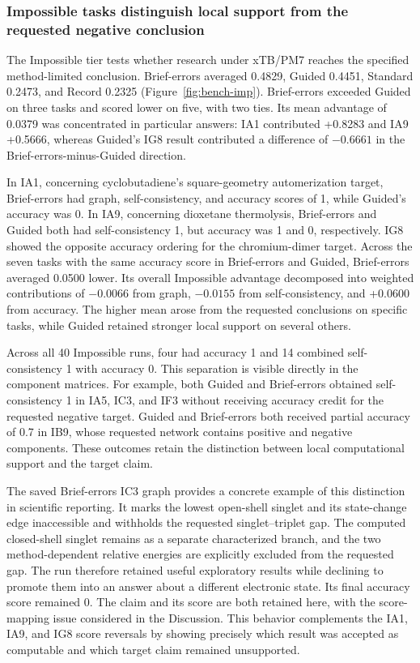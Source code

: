 \subsubsection{Impossible tasks distinguish local support from the requested negative conclusion}

The Impossible tier tests whether research under xTB/PM7 reaches the specified method-limited conclusion. Brief-errors averaged 0.4829, Guided 0.4451, Standard 0.2473, and Record 0.2325 (Figure~\ref{fig:bench-imp}). Brief-errors exceeded Guided on three tasks and scored lower on five, with two ties. Its mean advantage of 0.0379 was concentrated in particular answers: IA1 contributed +0.8283 and IA9 +0.5666, whereas Guided's IG8 result contributed a difference of $-0.6661$ in the Brief-errors-minus-Guided direction.

In IA1, concerning cyclobutadiene's square-geometry automerization target, Brief-errors had graph, self-consistency, and accuracy scores of 1, while Guided's accuracy was 0. In IA9, concerning dioxetane thermolysis, Brief-errors and Guided both had self-consistency 1, but accuracy was 1 and 0, respectively. IG8 showed the opposite accuracy ordering for the chromium-dimer target. Across the seven tasks with the same accuracy score in Brief-errors and Guided, Brief-errors averaged 0.0500 lower. Its overall Impossible advantage decomposed into weighted contributions of $-0.0066$ from graph, $-0.0155$ from self-consistency, and +0.0600 from accuracy. The higher mean arose from the requested conclusions on specific tasks, while Guided retained stronger local support on several others.

Across all 40 Impossible runs, four had accuracy 1 and 14 combined self-consistency 1 with accuracy 0. This separation is visible directly in the component matrices. For example, both Guided and Brief-errors obtained self-consistency 1 in IA5, IC3, and IF3 without receiving accuracy credit for the requested negative target. Guided and Brief-errors both received partial accuracy of 0.7 in IB9, whose requested network contains positive and negative components. These outcomes retain the distinction between local computational support and the target claim.

The saved Brief-errors IC3 graph provides a concrete example of this distinction in scientific reporting. It marks the lowest open-shell singlet and its state-change edge inaccessible and withholds the requested singlet--triplet gap. The computed closed-shell singlet remains as a separate characterized branch, and the two method-dependent relative energies are explicitly excluded from the requested gap. The run therefore retained useful exploratory results while declining to promote them into an answer about a different electronic state. Its final accuracy score remained 0. The claim and its score are both retained here, with the score-mapping issue considered in the Discussion. This behavior complements the IA1, IA9, and IG8 score reversals by showing precisely which result was accepted as computable and which target claim remained unsupported.

